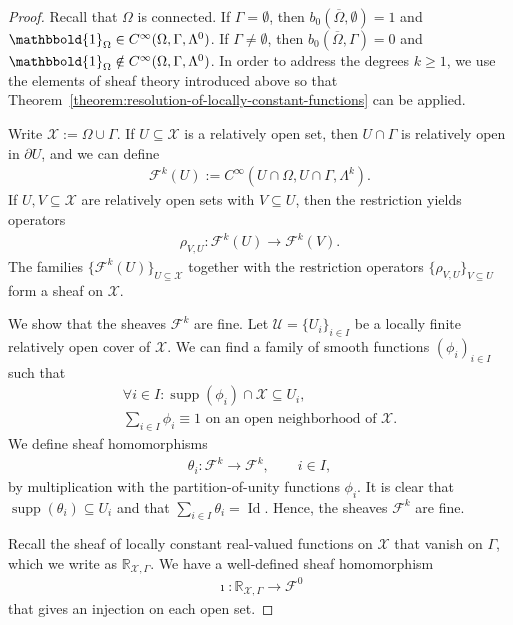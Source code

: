 \documentclass[10pt,a4paper]{amsart}
\theoremstyle{definition}
\theoremstyle{remark}
\numberwithin{equation}{section}
\newcommand{\bbR}{{\mathbb R}}
\newcommand{\calF}{{\mathcal F}}
\newcommand{\calU}{{\mathcal U}}
\newcommand{\calX}{{\mathcal X}}
\newcommand{\closure}{\overline}
\newcommand{\Id}{\operatorname{Id}}
\newcommand{\bboldone}{\mathbbold{1}}
\newcommand{\supp}{\operatorname{supp}}
\newcommand{\Domain}{{\Omega}}
\newcommand{\Cover}{\calU}
\newcommand{\Alt}[1]{\Lambda^{#1}}
\begin{document}
\begin{proof}
    Recall that $\Domain$ is connected.
    If $\Gamma = \emptyset$, then $b_{0}(\closure\Domain,\emptyset) = 1$ and $\bboldone_{\Domain} \in C^{\infty}(\Domain,\Gamma,\Alt{0})$.
    If $\Gamma \neq \emptyset$, then $b_{0}(\closure\Domain,\Gamma) = 0$ and $\bboldone_{\Domain} \notin C^{\infty}(\Domain,\Gamma,\Alt{0})$.
    In order to address the degrees $k \geq 1$,
    we use the elements of sheaf theory introduced above so that Theorem~\ref{theorem:resolution-of-locally-constant-functions} can be applied. 
    
    Write $\calX := \Domain \cup \Gamma$. 
    If $U \subseteq \calX$ is a relatively open set, 
    then $U \cap \Gamma$ is relatively open in $\partial U$, and we can define 
    \begin{align*}
        \calF^{k}(U) :=  C^{\infty}( U \cap \Domain, U \cap \Gamma, \Alt{k})
        .
    \end{align*}
    If $U,V \subseteq \calX$ are relatively open sets with $V \subseteq U$, 
    then the restriction yields operators 
    \begin{gather*}
        \rho_{V,U} : \calF^{k}(U) \to \calF^{k}(V)
        .
    \end{gather*}
    The families $\{ \calF^{k}(U) \}_{U \subseteq \calX}$ together with the restriction operators $\{ \rho_{V,U} \}_{V \subseteq U}$ form a sheaf on $\calX$.
    
    We show that the sheaves $\calF^{k}$ are fine.
    Let $\Cover = \{ U_{i} \}_{i \in I}$ be a locally finite relatively open cover of $\calX$.
    We can find a family of smooth functions $( \phi_{i} )_{i \in I}$ such that 
    \begin{gather*}
        \forall i \in I : \supp(\phi_{i}) \cap \calX \subseteq U_{i}
        ,
        \\
        \sum_{i \in I} \phi_{i} \equiv 1 \text{ on an open neighborhood of } \calX
        .
    \end{gather*}
    We define sheaf homomorphisms
    \begin{align*}
        \theta_{i} : \calF^{k} \to \calF^{k}, \qquad i \in I,
    \end{align*}
    by multiplication with the partition-of-unity functions $\phi_{i}$.
    It is clear that $\supp(\theta_{i}) \subseteq U_{i}$ and that $\sum_{i \in I} \theta_{i} = \Id$.
    Hence, the sheaves $\calF^{k}$ are fine.

    Recall the sheaf of locally constant real-valued functions on $\calX$ that vanish on $\Gamma$,
    which we write as $\bbR_{\calX,\Gamma}$.
    We have a well-defined sheaf homomorphism
    \begin{align*}
        \imath : \bbR_{\calX,\Gamma} \to \calF^{0}
    \end{align*}
    that gives an injection on each open set. 
    

\end{proof}
\end{document}
